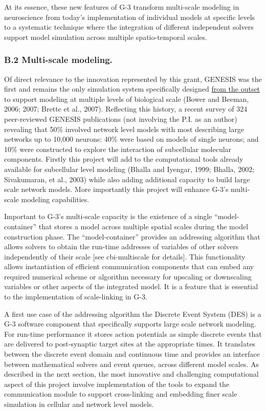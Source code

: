 \documentclass[12pt]{article}
\begin{document}
At its essence, these new features of G-3 transform multi-scale
modeling in neuroscience from today's implementation of individual
models at specific levels to a systematic technique where the
integration of different independent solvers support model simulation
across multiple spatio-temporal scales.

\subsubsection*{B.2 Multi-scale modeling.}

\noindent Of direct relevance to the innovation represented by this
grant, GENESIS was the first and remains the only simulation system
specifically designed \underline{from the outset} to support modeling
at multiple levels of biological scale (Bower and Beeman, 2006; 2007;
Brette et al., 2007). Reflecting this history, a recent survey of 324
peer-reviewed GENESIS publications (not involving the P.I. as an
author) revealing that 50\% involved network level models with most
describing large networks up to 10,000 neurons: 40\% were based on
models of single neurons; and 10\% were constructed to explore the
interaction of subcellular molecular components.  Firstly this project
will add to the computational tools already available for subcellular
level modeling (Bhalla and Iyengar, 1999; Bhalla, 2002; Sivakumaran,
et al., 2003) while also adding additional capacity to build large
scale network models.  More importantly this project will enhance
G-3's multi-scale modeling capabilities.

Important to G-3's multi-scale capacity is the existence of a single
``model-container'' that stores a model across multiple spatial scales
during the model construction phase.  The ``model-container'' provides
an addressing algorithm that allows solvers to obtain the run-time
addresses of variables of other solvers independently of their scale
[see cbi-multiscale for details].  This functionality allows
instantiation of efficient communication components that can embed any
required numerical scheme or algorithm necessary for upscaling or
downscaling variables or other aspects of the integrated model.  It is
a feature that is essential to the implementation of scale-linking in
G-3.

A first use case of the addressing algorithm the Discrete Event System
(DES) is a G-3 software component that specifically supports large
scale network modeling.  For run-time performance it stores action
potentials as simple discrete events that are delivered to
post-synaptic target sites at the appropriate times. It translates
between the discrete event domain and continuous time and provides an
interface between mathematical solvers and event queues, across
different model scales.
As described in the next section, the most innovative and challenging
computational aspect of this project involve implementation of the
tools to expand the communication module to support cross-linking and
embedding finer scale simulation in cellular and network level models.
\end{document}
